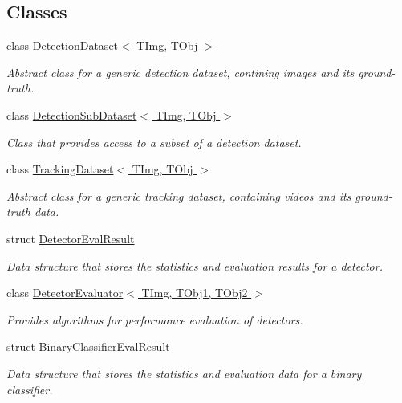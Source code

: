 \subsection*{Classes}
\begin{DoxyCompactItemize}
\item 
class \hyperlink{class_vision_core_1_1_evaluation_1_1_detection_dataset}{Detection\+Dataset$<$ T\+Img, T\+Obj $>$}
\begin{DoxyCompactList}\small\item\em Abstract class for a generic detection dataset, contining images and its ground-\/truth. \end{DoxyCompactList}\item 
class \hyperlink{class_vision_core_1_1_evaluation_1_1_detection_sub_dataset}{Detection\+Sub\+Dataset$<$ T\+Img, T\+Obj $>$}
\begin{DoxyCompactList}\small\item\em Class that provides access to a subset of a detection dataset. \end{DoxyCompactList}\item 
class \hyperlink{class_vision_core_1_1_evaluation_1_1_tracking_dataset}{Tracking\+Dataset$<$ T\+Img, T\+Obj $>$}
\begin{DoxyCompactList}\small\item\em Abstract class for a generic tracking dataset, containing videos and its ground-\/truth data. \end{DoxyCompactList}\item 
struct \hyperlink{struct_vision_core_1_1_evaluation_1_1_detector_eval_result}{Detector\+Eval\+Result}
\begin{DoxyCompactList}\small\item\em Data structure that stores the statistics and evaluation results for a detector. \end{DoxyCompactList}\item 
class \hyperlink{class_vision_core_1_1_evaluation_1_1_detector_evaluator}{Detector\+Evaluator$<$ T\+Img, T\+Obj1, T\+Obj2 $>$}
\begin{DoxyCompactList}\small\item\em Provides algorithms for performance evaluation of detectors. \end{DoxyCompactList}\item 
struct \hyperlink{struct_vision_core_1_1_evaluation_1_1_binary_classifier_eval_result}{Binary\+Classifier\+Eval\+Result}
\begin{DoxyCompactList}\small\item\em Data structure that stores the statistics and evaluation data for a binary classifier. \end{DoxyCompactList}\item 

\end{DoxyCompactItemize}
